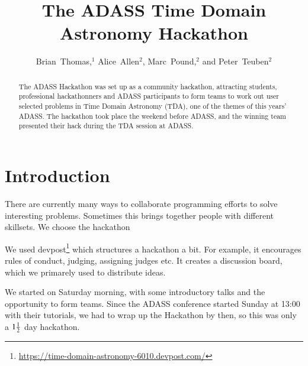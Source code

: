 \documentclass[11pt,twoside]{article}
\begin{document}
\title{The ADASS Time Domain Astronomy Hackathon}
\author{Brian~Thomas,$^1$ Alice~Allen$^2$, Marc~Pound,$^2$ and Peter~Teuben$^2$}





\begin{abstract}

The ADASS Hackathon was set up as a community hackathon, attracting
students, professional hackathonners and ADASS participants to form
teams to work out user selected problems in Time Domain Astronomy
(TDA), one of the themes of this years' ADASS. The hackathon took
place the weekend before ADASS, and the winning team presented their
hack during the TDA session at ADASS.


\end{abstract}



\section{Introduction}

There are currently many ways to collaborate programming efforts to solve interesting problems.
Sometimes this brings together people with different skillsets. We choose the hackathon



We used devpost\footnote{\url{https://time-domain-astronomy-6010.devpost.com/}}
which structures a hackathon a bit. For example, it encourages rules of conduct,
judging, assigning judges etc.  It creates a discussion board, which we primarely used to
distribute ideas.

We started on Saturday morning, with some introductory talks and the opportunity to form teams.
Since the ADASS conference started Sunday at 13:00 with their tutorials, we had to wrap up
the Hackathon by then, so this was only a ${1 {1\over 2}}$ day hackathon.
\end{document}
